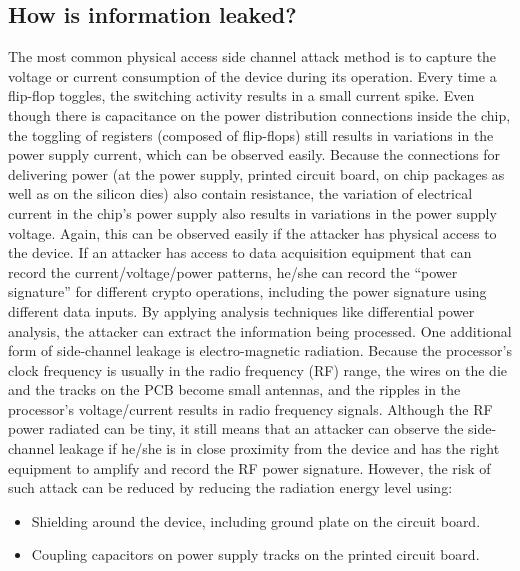 \documentclass[a4paper,]{report}
\providecommand{\tightlist}{%
  \setlength{\itemsep}{0pt}\setlength{\parskip}{0pt}}
\begin{document}
\hypertarget{how-is-information-leaked}{%
\subsection{How is information
leaked?}\label{how-is-information-leaked}}

The most common physical access side channel attack method is to capture
the voltage or current consumption of the device during its operation.
Every time a flip-flop toggles, the switching activity results in a
small current spike. Even though there is capacitance on the power
distribution connections inside the chip, the toggling of registers
(composed of flip-flops) still results in variations in the power supply
current, which can be observed easily. Because the connections for
delivering power (at the power supply, printed circuit board, on chip
packages as well as on the silicon dies) also contain resistance, the
variation of electrical current in the chip's power supply also results
in variations in the power supply voltage. Again, this can be observed
easily if the attacker has physical access to the device. If an attacker
has access to data acquisition equipment that can record the
current/voltage/power patterns, he/she can record the ``power
signature'' for different crypto operations, including the power
signature using different data inputs. By applying analysis techniques
like differential power analysis, the attacker can extract the
information being processed. One additional form of side-channel leakage
is electro-magnetic radiation. Because the processor's clock frequency
is usually in the radio frequency (RF) range, the wires on the die and
the tracks on the PCB become small antennas, and the ripples in the
processor's voltage/current results in radio frequency signals. Although
the RF power radiated can be tiny, it still means that an attacker can
observe the side-channel leakage if he/she is in close proximity from
the device and has the right equipment to amplify and record the RF
power signature. However, the risk of such attack can be reduced by
reducing the radiation energy level using:

\begin{itemize}
\tightlist
\item
  Shielding around the device, including ground plate on the circuit
  board.
\item
  Coupling capacitors on power supply tracks on the printed circuit
  board.
\end{itemize}
\end{document}
